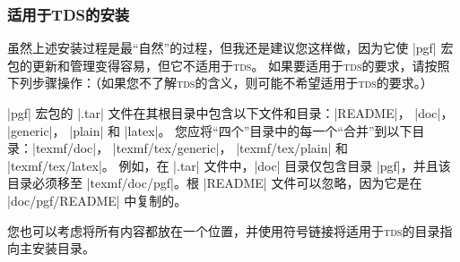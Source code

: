 \subsubsection{适用于TDS的安装}


虽然上述安装过程是最``自然''的过程，但我还是建议您这样做，因为它使 |pgf| 宏包的更新和管理变得容易，但它不适用于\textsc{tds}。 如果要适用于\textsc{tds}的要求，请按照下列步骤操作：（如果您不了解\textsc{tds}的含义，则可能不希望适用于\textsc{tds}的要求。）


|pgf| 宏包的 |.tar| 文件在其根目录中包含以下文件和目录：|README|， |doc|，  |generic|， |plain| 和 |latex|。 您应将``四个''目录中的每一个``合并''到以下目录：|texmf/doc|， |texmf/tex/generic|， |texmf/tex/plain| 和 |texmf/tex/latex|。 例如，在 |.tar| 文件中，|doc| 目录仅包含目录 |pgf|，并且该目录必须移至 |texmf/doc/pgf|。根 |README| 文件可以忽略，因为它是在 |doc/pgf/README| 中复制的。


您也可以考虑将所有内容都放在一个位置，并使用符号链接将适用于\textsc{tds}的目录指向主安装目录。


